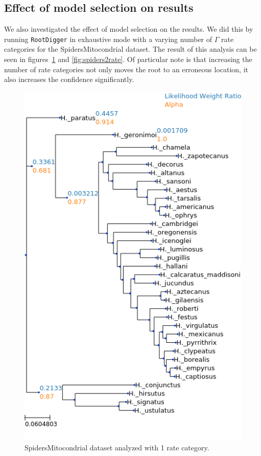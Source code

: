 \documentclass{article}
\newcommand{\RootDiggertt}{\texttt{RootDigger}}
\begin{document}
\subsection{Effect of model selection on results}

We also investigated the effect of model selection on the results.
We did this by running \RootDiggertt{} in exhaustive mode with a varying number
of $\Gamma$ rate categories for the SpidersMitocondrial dataset.
The result of this analysis can be seen in figures~\ref{fig:spiders1rate} and
\ref{fig:spiders2rate}.
Of particular note is that increasing the number of rate categories not only
moves the root to an erroneous location, it also increases the confidence
significantly.

\begin{figure}[H]
  \begin{center}
    \includegraphics[width=.75\linewidth]{figs/spiders/1rate.png}
    \caption{SpidersMitocondrial dataset analyzed with 1 rate category.}
    \label{fig:spiders1rate}
  \end{center}
\end{figure}
\end{document}
